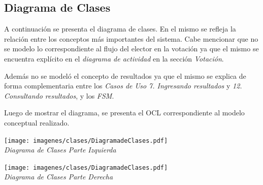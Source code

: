 \documentclass[spanish, 10pt,a4paper]{article}
\numberwithin{equation}{section} %
\begin{document}
\newpage
\subsection{Diagrama de Clases}
	A continuación se presenta el diagrama de clases. En el mismo se refleja la relación entre los conceptos más importantes del sistema. Cabe mencionar que no se modelo lo correspondiente al flujo del elector en la votación ya que el mismo se encuentra explícito en el \textit{diagrama de actividad } en la sección \textit{Votación}. 
\par Además no se modeló el concepto de resultados ya que el mismo se explica de forma complementaria entre los \textit{Casos de Uso 7. Ingresando resultados} y \textit{12. Consultando resultados}, y los \textit{FSM}.
\par Luego de mostrar el diagrama, se presenta el OCL correspondiente al modelo conceptual realizado. 

\vspace{\baselineskip}
    \begin{center}
                \texttt{[image: imagenes/clases/DiagramadeClases.pdf]}
                \\
                \vspace{1pt}
                \footnotesize\textit{Diagrama de Clases Parte Izquierda}
        \end{center}
\vspace{\baselineskip}

\vspace{\baselineskip}
    \begin{center}
                \texttt{[image: imagenes/clases/DiagramadeClases.pdf]}
                \\
                \vspace{1pt}
                \footnotesize\textit{Diagrama de Clases Parte Derecha}
        \end{center}
\vspace{\baselineskip}
\end{document}
